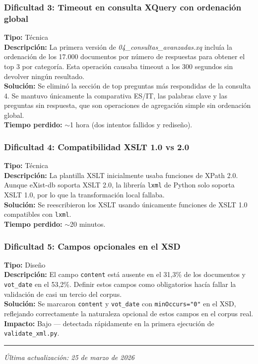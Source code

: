 \documentclass[11pt,a4paper]{article}
\newcommand{\notetitle}[1]{\subsubsection*{#1}}
\begin{document}
\vspace{6pt}
\notetitle{Dificultad 3: Timeout en consulta XQuery con ordenación global}
\textbf{Tipo:} Técnica\\
\textbf{Descripción:} La primera versión de \textit{04\_consultas\_avanzadas.xq} incluía la ordenación de los 17.000 documentos por número de respuestas para obtener el top 3 por categoría. Esta operación causaba timeout a los 300 segundos sin devolver ningún resultado.\\
\textbf{Solución:} Se eliminó la sección de top preguntas más respondidas de la consulta 4. Se mantuvo únicamente la comparativa ES/IT, las palabras clave y las preguntas sin respuesta, que son operaciones de agregación simple sin ordenación global.\\
\textbf{Tiempo perdido:} $\sim$1 hora (dos intentos fallidos y rediseño).

\vspace{6pt}
\notetitle{Dificultad 4: Compatibilidad XSLT 1.0 vs 2.0}
\textbf{Tipo:} Técnica\\
\textbf{Descripción:} La plantilla XSLT inicialmente usaba funciones de XPath 2.0. Aunque eXist-db soporta XSLT 2.0, la librería \texttt{lxml} de Python solo soporta XSLT 1.0, por lo que la transformación local fallaba.\\
\textbf{Solución:} Se reescribieron los XSLT usando únicamente funciones de XSLT 1.0 compatibles con \texttt{lxml}.\\
\textbf{Tiempo perdido:} $\sim$20 minutos.

\vspace{6pt}
\notetitle{Dificultad 5: Campos opcionales en el XSD}
\textbf{Tipo:} Diseño\\
\textbf{Descripción:} El campo \texttt{content} está ausente en el 31,3\% de los documentos y \texttt{vot\_date} en el 53,2\%. Definir estos campos como obligatorios hacía fallar la validación de casi un tercio del corpus.\\
\textbf{Solución:} Se marcaron \texttt{content} y \texttt{vot\_date} con \texttt{minOccurs="0"} en el XSD, reflejando correctamente la naturaleza opcional de estos campos en el corpus real.\\
\textbf{Impacto:} Bajo --- detectada rápidamente en la primera ejecución de \texttt{validate\_xml.py}.

\vspace{20pt}
\hrule
\vspace{6pt}
{\small\textit{Última actualización: 25 de marzo de 2026}}

\label{lastpage}
\end{document}
